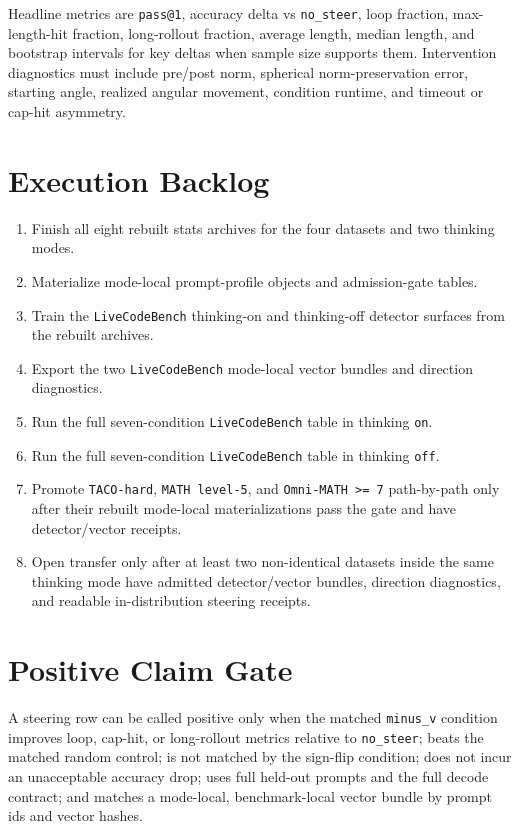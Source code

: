 \documentclass[11pt]{article}
\begin{document}
Headline metrics are \texttt{pass@1}, accuracy delta vs \texttt{no\_steer},
loop fraction, max-length-hit fraction, long-rollout fraction, average length,
median length, and bootstrap intervals for key deltas when sample size supports
them. Intervention diagnostics must include pre/post norm, spherical
norm-preservation error, starting angle, realized angular movement, condition
runtime, and timeout or cap-hit asymmetry.

\section*{Execution Backlog}
\begin{enumerate}
\item Finish all eight rebuilt stats archives for the four datasets and two
thinking modes.
\item Materialize mode-local prompt-profile objects and admission-gate tables.
\item Train the \texttt{LiveCodeBench} thinking-on and thinking-off detector
surfaces from the rebuilt archives.
\item Export the two \texttt{LiveCodeBench} mode-local vector bundles and
direction diagnostics.
\item Run the full seven-condition \texttt{LiveCodeBench} table in thinking
\texttt{on}.
\item Run the full seven-condition \texttt{LiveCodeBench} table in thinking
\texttt{off}.
\item Promote \texttt{TACO-hard}, \texttt{MATH level-5}, and
\texttt{Omni-MATH >= 7} path-by-path only after their rebuilt mode-local
materializations pass the gate and have detector/vector receipts.
\item Open transfer only after at least two non-identical datasets inside the
same thinking mode have admitted detector/vector bundles, direction diagnostics,
and readable in-distribution steering receipts.
\end{enumerate}

\section*{Positive Claim Gate}
A steering row can be called positive only when the matched \texttt{minus\_v}
condition improves loop, cap-hit, or long-rollout metrics relative to
\texttt{no\_steer}; beats the matched random control; is not matched by the
sign-flip condition; does not incur an unacceptable accuracy drop; uses full
held-out prompts and the full decode contract; and matches a mode-local,
benchmark-local vector bundle by prompt ids and vector hashes.
\end{document}
